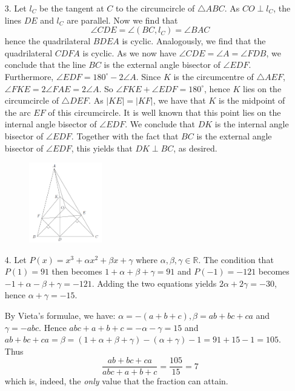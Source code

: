 \documentclass[a4paper, 12pt]{article}
\begin{document}
\begin{enumerate}
    
    \item[3.] Let $l_C$ be the tangent at $C$ to the circumcircle of $\triangle ABC$. As $CO \perp l_C$, the lines $DE$ and $l_C$ are parallel. Now we find that
    $$ \angle CDE = \angle (BC, l_C) = \angle BAC $$
    hence the quadrilateral $BDEA$ is cyclic. Analogously, we find that the quadrilateral $CDFA$ is cyclic. As we now have $\angle CDE = \angle A = \angle FDB$, we conclude that the line $BC$ is the external angle bisector of $\angle EDF$. Furthermore, $\angle EDF = 180^\circ - 2 \angle A$. Since $K$ is the circumcentre of $\triangle AEF$, $\angle FKE = 2 \angle FAE = 2 \angle A$. So $\angle FKE + \angle EDF = 180^\circ$, hence $K$ lies on the circumcircle of $\triangle DEF$. As $|KE| = |KF|$, we have that $K$ is the midpoint of the arc $EF$ of this circumcircle. It is well known that this point lies on the internal angle bisector of $\angle EDF$. We conclude that $DK$ is the internal angle bisector of $\angle EDF$. Together with the fact that $BC$ is the external angle bisector of $\angle EDF$, this yields that $DK \perp BC$, as desired.
    
    \begin{figure}[h!]
        \centering
        \includegraphics[width=0.3\textwidth]{seniortest2_q3.PNG}
    \end{figure}
    
    
    \item[4.] Let $P(x) = x^3 + \alpha x^2 + \beta x + \gamma$ where $\alpha, \beta, \gamma \in \mathbb{R}$. The condition that $P(1) = 91$ then becomes $1 + \alpha + \beta + \gamma = 91$ and $P(-1) = -121$ becomes $-1 + \alpha - \beta + \gamma = -121$. Adding the two equations yields $2 \alpha + 2 \gamma = -30$, hence $\alpha + \gamma = -15$.
    
    By Vieta's formulae, we have: $\alpha = -(a+b+c), \beta = ab + bc + ca$ and $\gamma = -abc$. Hence $abc + a + b + c = - \alpha - \gamma = 15$ and $ab+bc+ca = \beta = (1 + \alpha + \beta + \gamma) - (\alpha + \gamma) - 1 = 91 + 15 - 1 = 105$. Thus
    \[  \frac{ab+bc+ca}{abc+a+b+c} = \frac{105}{15} = 7  \]
    which is, indeed, the \textit{only} value that the fraction can attain.
    

\end{enumerate}
\end{document}
